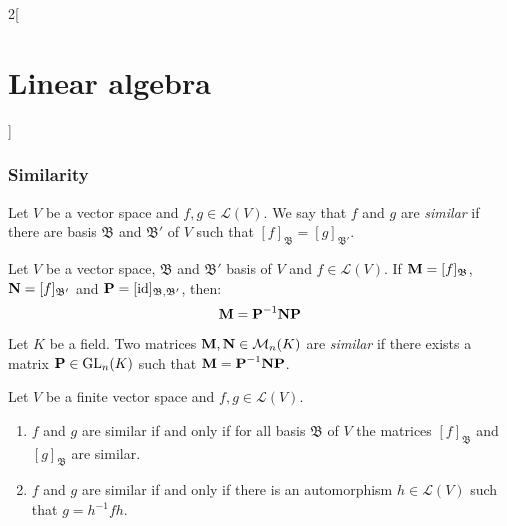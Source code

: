 \documentclass[../../../main.tex]{subfiles}
\begin{document}
\begin{multicols}{2}[\section{Linear algebra}]
  \subsubsection{Similarity}
  \begin{definition}
    Let $V$ be a vector space and $f,g\in\mathcal{L}(V)$. We say that $f$ and $g$ are \textit{similar} if there are basis $\mathfrak{B}$ and $\mathfrak{B}'$ of $V$ such that $[f]_\mathfrak{B}=[g]_{\mathfrak{B}'}$.
  \end{definition}
  \begin{lemma}
    Let $V$ be a vector space, $\mathfrak{B}$ and $\mathfrak{B}'$ basis of $V$ and $f\in\mathcal{L}(V)$. If $\boldsymbol{\mathrm{M}}=[f]_\mathfrak{B}$, $\boldsymbol{\mathrm{N}}=[f]_{\mathfrak{B}'}$ and $\boldsymbol{\mathrm{P}}=[\mathrm{id}]_{\mathfrak{B},\mathfrak{B}'}$, then: $$\boldsymbol{\mathrm{M}}=\boldsymbol{\mathrm{P}}^{-1}\boldsymbol{\mathrm{N}}\boldsymbol{\mathrm{P}}$$
  \end{lemma}
  \begin{definition}
    Let $K$ be a field. Two matrices $\boldsymbol{\mathrm{M}}, \boldsymbol{\mathrm{N}}\in\mathcal{M}_n(K)$ are \textit{similar} if there exists a matrix $\boldsymbol{\mathrm{P}}\in\mathrm{GL}_n(K)$ such that $\boldsymbol{\mathrm{M}}=\boldsymbol{\mathrm{P}}^{-1}\boldsymbol{\mathrm{N}}\boldsymbol{\mathrm{P}}$.
  \end{definition}
  \begin{prop}
    Let $V$ be a finite vector space and $f,g\in\mathcal{L}(V)$.
    \begin{enumerate}
      \item $f$ and $g$ are similar if and only if for all basis $\mathfrak{B}$ of $V$ the matrices $[f]_\mathfrak{B}$ and $[g]_\mathfrak{B}$ are similar.
      \item $f$ and $g$ are similar if and only if there is an automorphism $h\in\mathcal{L}(V)$ such that $g=h^{-1}fh$.
    \end{enumerate}
  \end{prop}

\end{multicols}
\end{document}
